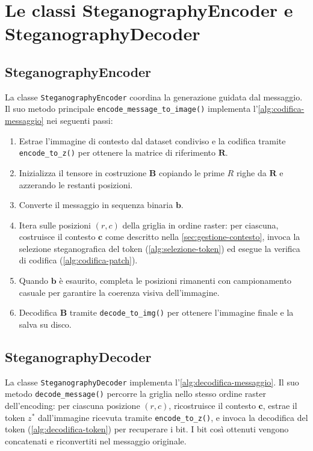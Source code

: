 \section{Le classi SteganographyEncoder e SteganographyDecoder}
\label{sec:classi-encoder-decoder}

\subsection{SteganographyEncoder}

La classe \texttt{SteganographyEncoder} coordina la generazione guidata dal messaggio. Il suo metodo principale \texttt{encode\_message\_to\_image()} implementa l'\autoref{alg:codifica-messaggio} nei seguenti passi:

\begin{enumerate}
	\item Estrae l'immagine di contesto dal dataset condiviso e la codifica tramite \texttt{encode\_to\_z()} per ottenere la matrice di riferimento $\mathbf{R}$.
	\item Inizializza il tensore in costruzione $\mathbf{B}$ copiando le prime $R$ righe da $\mathbf{R}$ e azzerando le restanti posizioni.
	\item Converte il messaggio in sequenza binaria $\mathbf{b}$.
	\item Itera sulle posizioni $(r,c)$ della griglia in ordine raster: per ciascuna, costruisce il contesto $\mathbf{c}$ come descritto nella \autoref{sec:gestione-contesto}, invoca la selezione steganografica del token (\autoref{alg:selezione-token}) ed esegue la verifica di codifica (\autoref{alg:codifica-patch}).
	\item Quando $\mathbf{b}$ è esaurito, completa le posizioni rimanenti con campionamento casuale per garantire la coerenza visiva dell'immagine.
	\item Decodifica $\mathbf{B}$ tramite \texttt{decode\_to\_img()} per ottenere l'immagine finale e la salva su disco.
\end{enumerate}

\subsection{SteganographyDecoder}

La classe \texttt{SteganographyDecoder} implementa l'\autoref{alg:decodifica-messaggio}. Il suo metodo \texttt{decode\_message()} percorre la griglia nello stesso ordine raster dell'encoding: per ciascuna posizione $(r,c)$, ricostruisce il contesto $\mathbf{c}$, estrae il token $z^*$ dall'immagine ricevuta tramite \texttt{encode\_to\_z()}, e invoca la decodifica del token (\autoref{alg:decodifica-token}) per recuperare i bit. I bit così ottenuti vengono concatenati e riconvertiti nel messaggio originale.

